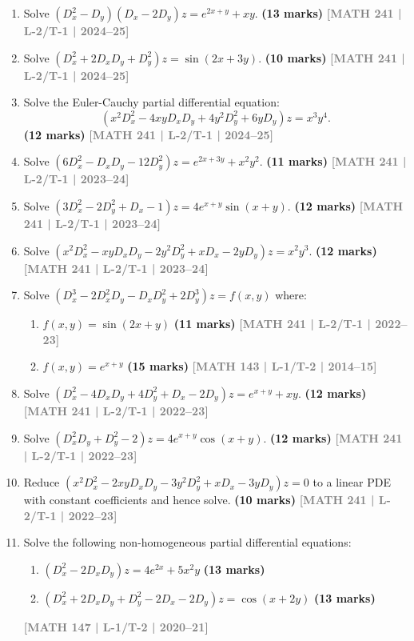 \documentclass[12pt,a3paper]{article}
\newcommand{\yr}[1]{\hfill\textcolor{gray}{\small\textbf{[#1]}}}
\newcommand{\mk}[1]{\textcolor{orange!70!black}{\small\textbf{(#1 marks)}}}
\begin{document}
\begin{enumerate}

\item Solve $(D_{x}^{2}-D_{y})(D_{x}-2D_{y})z=e^{2x+y}+xy$.
\mk{13} \yr{MATH 241 | L-2/T-1 | 2024--25}


\item Solve $(D_{x}^{2}+2D_{x}D_{y}+D_{y}^{2})z=\sin(2x+3y)$.
\mk{10} \yr{MATH 241 | L-2/T-1 | 2024--25}


\item Solve the Euler-Cauchy partial differential equation:
\[
(x^{2}D_{x}^{2}-4xyD_{x}D_{y}+4y^{2}D_{y}^{2}+6yD_{y})z=x^{3}y^{4}.
\]
\mk{12} \yr{MATH 241 | L-2/T-1 | 2024--25}


\item Solve $(6D_{x}^{2}-D_{x}D_{y}-12D_{y}^{2})z=e^{2x+3y}+x^{2}y^{2}$.
\mk{11} \yr{MATH 241 | L-2/T-1 | 2023--24}


\item Solve $(3D_{x}^{2}-2D_{y}^{2}+D_{x}-1)z=4e^{x+y}\sin(x+y)$.
\mk{12} \yr{MATH 241 | L-2/T-1 | 2023--24}


\item Solve $(x^{2}D_{x}^{2}-xyD_{x}D_{y}-2y^{2}D_{y}^{2}+xD_{x}-2yD_{y})z=x^{2}y^{3}$.
\mk{12} \yr{MATH 241 | L-2/T-1 | 2023--24}


\item Solve $(D_{x}^{3}-2D_{x}^{2}D_{y}-D_{x}D_{y}^{2}+2D_{y}^{3})z=f(x,y)$ where:
\begin{enumerate}
  \item $f(x,y) = \sin(2x+y)$ \mk{11} \yr{MATH 241 | L-2/T-1 | 2022--23}
  \item $f(x,y) = e^{x+y}$ \mk{15} \yr{MATH 143 | L-1/T-2 | 2014--15}
\end{enumerate}


\item Solve $(D_{x}^{2}-4D_{x}D_{y}+4D_{y}^{2}+D_{x}-2D_{y})z=e^{x+y}+xy$.
\mk{12} \yr{MATH 241 | L-2/T-1 | 2022--23}


\item Solve $(D_{x}^{2}D_{y}+D_{y}^{2}-2)z=4e^{x+y}\cos(x+y)$.
\mk{12} \yr{MATH 241 | L-2/T-1 | 2022--23}


\item Reduce $(x^{2}D_{x}^{2}-2xyD_{x}D_{y}-3y^{2}D_{y}^{2}+xD_{x}-3yD_{y})z=0$ to a linear PDE with constant coefficients and hence solve.
\mk{10} \yr{MATH 241 | L-2/T-1 | 2022--23}


\item Solve the following non-homogeneous partial differential equations:
\begin{enumerate}
  \item $(D_{x}^{2}-2D_{x}D_{y})z=4e^{2x}+5x^{2}y$ \mk{13}
  \item $(D_{x}^{2}+2D_{x}D_{y}+D_{y}^{2}-2D_{x}-2D_{y})z=\cos(x+2y)$ \mk{13}
\end{enumerate}
\yr{MATH 147 | L-1/T-2 | 2020--21}



\end{enumerate}
\end{document}

